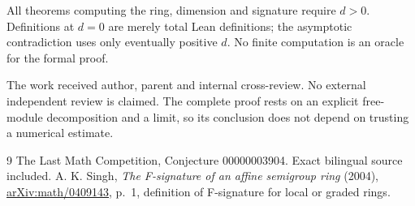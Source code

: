 \documentclass[11pt]{article}
\begin{document}
All theorems computing the ring, dimension and signature require
$d>0$. Definitions at $d=0$ are merely total Lean definitions;
the asymptotic contradiction uses only eventually positive $d$.
No finite computation is an oracle for the formal proof.

The work received author, parent and internal cross-review.
No external independent review is claimed. The complete proof
rests on an explicit free-module decomposition and a limit, so its
conclusion does not depend on trusting a numerical estimate.

\begin{thebibliography}{9}
 The Last Math Competition,
Conjecture 00000003904. Exact bilingual source included.
 A. K. Singh,
\emph{The F-signature of an affine semigroup ring} (2004),
\href{https://arxiv.org/abs/math/0409143}{arXiv:math/0409143},
p.~1, definition of F-signature for local or graded rings.
\end{thebibliography}
\end{document}
